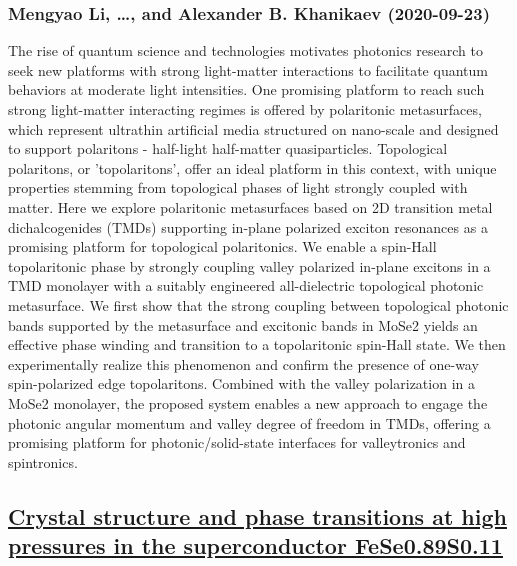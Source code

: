 \subsubsection*{Mengyao Li, \dots, and Alexander B. Khanikaev (2020-09-23)}
The rise of quantum science and technologies motivates photonics research to
seek new platforms with strong light-matter interactions to facilitate quantum
behaviors at moderate light intensities. One promising platform to reach such
strong light-matter interacting regimes is offered by polaritonic metasurfaces,
which represent ultrathin artificial media structured on nano-scale and
designed to support polaritons - half-light half-matter quasiparticles.
Topological polaritons, or 'topolaritons', offer an ideal platform in this
context, with unique properties stemming from topological phases of light
strongly coupled with matter. Here we explore polaritonic metasurfaces based on
2D transition metal dichalcogenides (TMDs) supporting in-plane polarized
exciton resonances as a promising platform for topological polaritonics. We
enable a spin-Hall topolaritonic phase by strongly coupling valley polarized
in-plane excitons in a TMD monolayer with a suitably engineered all-dielectric
topological photonic metasurface. We first show that the strong coupling
between topological photonic bands supported by the metasurface and excitonic
bands in MoSe2 yields an effective phase winding and transition to a
topolaritonic spin-Hall state. We then experimentally realize this phenomenon
and confirm the presence of one-way spin-polarized edge topolaritons. Combined
with the valley polarization in a MoSe2 monolayer, the proposed system enables
a new approach to engage the photonic angular momentum and valley degree of
freedom in TMDs, offering a promising platform for photonic/solid-state
interfaces for valleytronics and spintronics.

\subsection*{\href{http://arxiv.org/abs/2009.11223v1}{Crystal structure and phase transitions at high pressures in the  superconductor FeSe0.89S0.11}}
